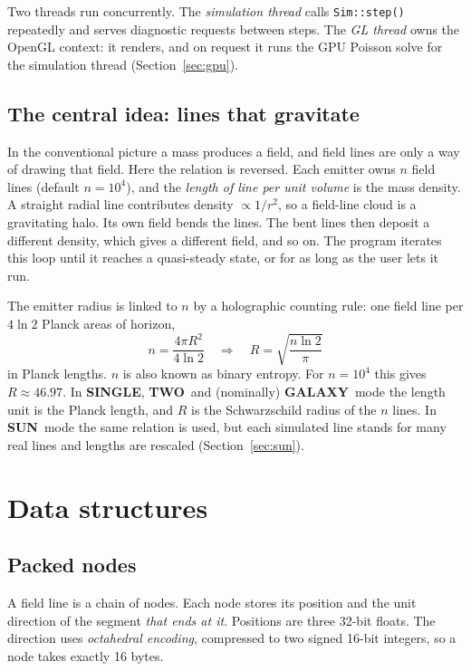 \documentclass[12pt]{article}
\newcommand{\GALAXY}{\textcolor{galaxyc}{\textbf{\textsf{GALAXY}}}}
\newcommand{\SUN}{\textcolor{sunc}{\textbf{\textsf{SUN}}}}
\newcommand{\SINGLE}{\textbf{\textsf{SINGLE}}}
\newcommand{\TWO}{\textbf{\textsf{TWO}}}
\begin{document}
Two threads run concurrently. The \emph{simulation thread} calls
\texttt{Sim::step()} repeatedly and serves diagnostic requests between steps.
The \emph{GL thread} owns the OpenGL context: it renders, and on request it
runs the GPU Poisson solve for the simulation thread (Section~\ref{sec:gpu}).

\subsection{The central idea: lines that gravitate}

In the conventional picture a mass produces a field, and field lines are only
a way of drawing that field. Here the relation is reversed. Each emitter owns
$n$ field lines (default $n=10^4$), and the \emph{length of line per unit
volume} is the mass density. A straight radial line contributes density
$\propto 1/r^2$, so a field-line cloud is a gravitating halo. Its own field
bends the lines. The bent lines then deposit a different density, which gives
a different field, and so on. The program iterates this loop until it reaches a
quasi-steady state, or for as long as the user lets it run.

The emitter radius is linked to $n$ by a holographic counting rule: one field
line per $4\ln 2$ Planck areas of horizon,
\begin{equation}
  n = \frac{4\pi R^2}{4\ln 2}
  \quad\Longrightarrow\quad
  R = \sqrt{\frac{n\ln 2}{\pi}}
  \label{eq:radius}
\end{equation}
in Planck lengths. 
$n$ is also known as binary entropy. 
For $n = 10^4$ this gives $R\approx 46.97$. In \SINGLE, \TWO\ and
(nominally) \GALAXY\ mode the length unit is the Planck length, and $R$ is the
Schwarzschild radius of the $n$ lines. In \SUN\ mode the same relation is used,
but each simulated line stands for many real lines and lengths are rescaled
(Section~\ref{sec:sun}).
\section{Data structures}

\subsection{Packed nodes}

A field line is a chain of nodes. Each node stores its position and the unit
direction of the segment \emph{that ends at it}. Positions are three 32-bit
floats. The direction uses \emph{octahedral encoding}, compressed to two signed
16-bit integers, so a node takes exactly 16 bytes.
\end{document}

